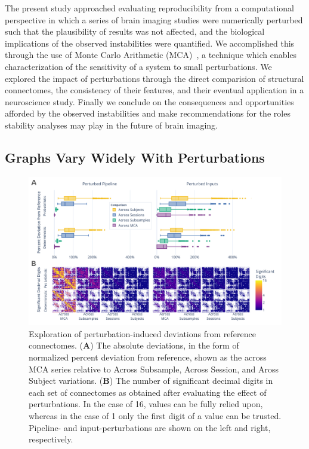 \documentclass[fleqn,10pt]{SelfArx} %
\begin{document}
The present study approached evaluating reproducibility from a computational perspective in which a series of brain
imaging studies were numerically perturbed such that the plausibility of results was not affected, and the biological
implications of the observed instabilities were quantified. We accomplished this through the use of Monte Carlo
Arithmetic (MCA)~\cite{Parker1997-qq}, a technique which enables characterization of the sensitivity of a system to
small perturbations. We explored the impact of perturbations through the direct comparision of structural connectomes,
the consistency of their features, and their eventual application in a neuroscience study. Finally we conclude on the
consequences and opportunities afforded by the observed instabilities and make recommendations for the roles stability
analyses may play in the future of brain imaging.

\subsection*{Graphs Vary Widely With Perturbations}
\begin{figure}[hbt]\centering
\includegraphics[width=0.98\linewidth]{figures/fig1_absolute_differences.pdf}
\caption{Exploration of perturbation-induced deviations from reference connectomes.
(\textbf{A}) The absolute deviations, in the form of normalized percent deviation from reference, shown as the
across MCA series relative to Across Subsample, Across Session, and Aross Subject variations.
(\textbf{B}) The number of significant decimal digits in each set of connectomes as obtained after evaluating the
effect of perturbations. In the case of 16, values can be fully relied upon, whereas in the case of 1 only the first
digit of a value can be trusted. Pipeline- and input-perturbations are shown on the left and right, respectively.}
\label{fig:absolute}
\end{figure}
\end{document}
